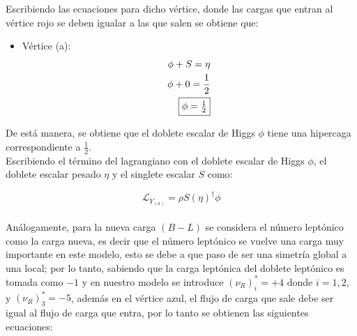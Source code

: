 \documentclass[12pt]{article}
\begin{document}
Escribiendo las ecuaciones para dicho vértice, donde las cargas que entran al vértice rojo se deben igualar a las que salen se obtiene que: \\

\begin{itemize}
    \item Vértice (a):
    \begin{equation}
    \label{eq:eqforhypercharge(b)}
    \begin{aligned}
            \phi+S=\eta \\
            \phi+ 0  = \frac{1}{2} \\
           \fbox{$ \phi=\frac{1}{2}$}
    \end{aligned}
    \end{equation}
\end{itemize}

De está manera, se obtiene que el doblete escalar de Higgs $\phi$ tiene una hipercaga correspondiente a $\frac{1}{2}$. \\

 Escribiendo el término del lagrangiano con el doblete escalar de Higgs $\phi$, el doblete escalar pesado $\eta$ y el singlete escalar $S$ como:

\begin{equation}
    \label{eq:LaYukawa(b)}
     \mathcal{L}_{Y_{(a)}} =   \rho S(\eta)^\dagger\phi 
\end{equation} \\

Análogamente, para la nueva carga $(B-L)$ se considera el número leptónico como la carga nueva, es decir que el número leptónico se vuelve una carga muy importante en este modelo, esto se debe a que paso de ser una simetría global a una local; por lo tanto, sabiendo que la carga leptónica del doblete leptónico es tomada como $-1$ y en nuestro modelo se introduce $(\nu_R)^*_i= +4 $ donde $i=1,2$, y $(\nu_R)^*_3=-5$, además en el vértice azul, el flujo de carga que sale debe ser igual al flujo de carga que entra, por lo tanto se obtienen las siguientes ecuaciones:  \\
\end{document}
